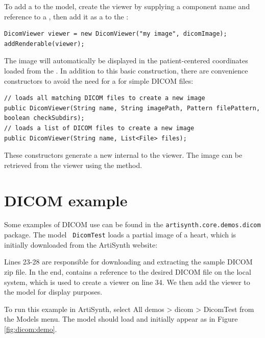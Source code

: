 To add a  to the model, create the viewer by supplying a component name
and reference to a , then add it as a  to the :
\begin{lstlisting}[]
DicomViewer viewer = new DicomViewer("my image", dicomImage);
addRenderable(viewer);
\end{lstlisting}
The image will automatically be displayed in the patient-centered coordinates loaded 
from the .  In addition to this basic construction, there 
are convenience constructors to avoid the need for a 
for simple DICOM files:
\begin{lstlisting}[]
// loads all matching DICOM files to create a new image
public DicomViewer(String name, String imagePath, Pattern filePattern, boolean checkSubdirs);
// loads a list of DICOM files to create a new image
public DicomViewer(String name, List<File> files);
\end{lstlisting}
These constructors generate a new  internal to the viewer.  The image
can be retrieved from the viewer using the  method.

\section{DICOM example}

Some examples of DICOM use can be found in
the \texttt{artisynth.core.demos.dicom} package. The model {\tt
DicomTest} loads a partial image of a heart, which is initially
downloaded from the ArtiSynth website:
%
\lstset{numbers=left}

\lstset{numbers=none}
%
Lines 23-28 are responsible for downloading and extracting the sample
DICOM zip file.  In the end,  contains a
reference to the desired DICOM file on the local system, which is used
to create a viewer on line 34.  We then add the viewer to the model
for display purposes.  

To run this example in ArtiSynth, select {\sf All demos > dicom >
DicomTest} from the {\sf Models} menu. The model should load and
initially appear as in Figure \ref{fig:dicom:demo}.

